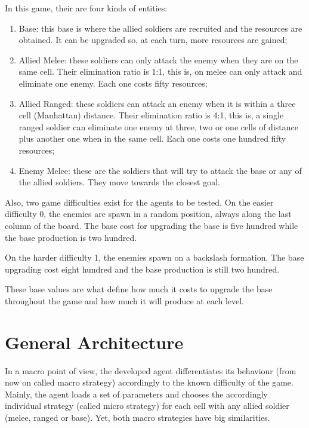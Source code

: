 \documentclass[conference]{IEEEtran}
\begin{document}
In this game, their are four kinds of entities:
%
\begin{enumerate}
    \item Base: this base is where the allied soldiers are recruited and the resources are obtained. It can be upgraded so, at each turn, more resources are gained;
    \item Allied Melee: these soldiers can only attack the enemy when they are on the same cell. Their elimination ratio is 1:1, this is, on melee can only attack and eliminate one enemy. Each one costs fifty resources;
    \item Allied Ranged: these soldiers can attack an enemy when it is within a three cell (Manhattan) distance. Their elimination ratio is 4:1, this is, a single ranged soldier can eliminate one enemy at three, two or one cells of distance plus another one when in the same cell. Each one costs one hundred fifty resources;
    \item Enemy Melee: these are the soldiers that will try to attack the base or any of the allied soldiers. They move towards the closest goal.
\end{enumerate}



Also, two game difficulties exist for the agents to be tested. On the easier difficulty 0, the enemies are spawn in a random position, always along the last column of the board. The base cost for upgrading the base is five hundred while the base production is two hundred.

On the harder difficulty 1, the enemies spawn on a backslash formation. The base upgrading cost eight hundred and the base production is still two hundred.

These base values are what define how much it costs to upgrade the base throughout the game and how much it will produce at each level.






\section{General Architecture}

In a macro point of view, the developed agent differentiates its behaviour (from now on called macro strategy) accordingly to the known difficulty of the game. Mainly, the agent loads a set of parameters and chooses the accordingly individual strategy (called micro strategy) for each cell with any allied soldier (melee, ranged or base). Yet, both macro strategies have big similarities.
\end{document}
